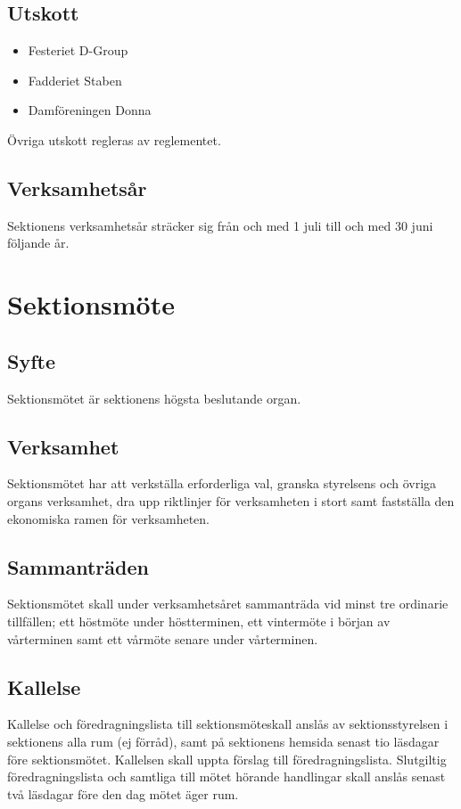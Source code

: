 \documentclass{datateknologsektionen-document}
\begin{document}
\subsection{Utskott}
\label{utskott}
\begin{itemize}
  \item Festeriet D-Group
  \item Fadderiet Staben
  \item Damföreningen Donna
\end{itemize}
Övriga utskott regleras av reglementet.

\subsection{Verksamhetsår}
Sektionens verksamhetsår sträcker sig från och med 1 juli till och med 30 juni följande
år.

\section{Sektionsmöte}
\subsection{Syfte}
Sektionsmötet är sektionens högsta beslutande organ.

\subsection{Verksamhet}
Sektionsmötet har att verkställa erforderliga val, granska styrelsens och övriga organs
verksamhet, dra upp riktlinjer för verksamheten i stort samt fastställa den ekonomiska
ramen för verksamheten.

\subsection{Sammanträden}
Sektionsmötet skall under verksamhetsåret sammanträda vid minst tre ordinarie tillfällen;
ett höstmöte under höstterminen, ett vintermöte i början av vårterminen samt ett vårmöte
senare under vårterminen.

\subsection{Kallelse}
Kallelse och föredragningslista till sektionsmöteskall anslås av sektionsstyrelsen i
sektionens alla rum (ej förråd), samt på sektionens hemsida senast tio läsdagar före
sektionsmötet. Kallelsen skall uppta förslag till föredragningslista. Slutgiltig
föredragningslista och samtliga till mötet hörande handlingar skall anslås senast två
läsdagar före den dag mötet äger rum.
\end{document}
